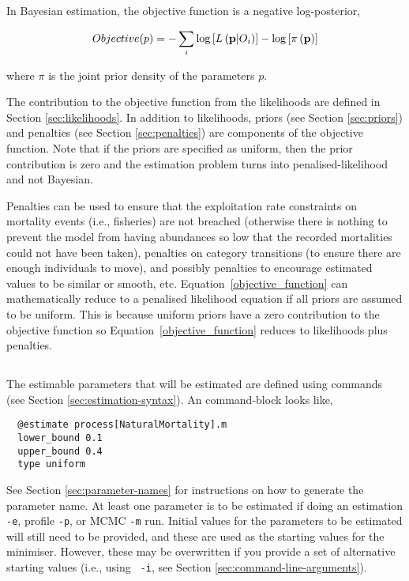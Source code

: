 In Bayesian estimation, the objective function is a negative log-posterior,

\begin{equation}\label{objective_function}
Objective(p)= - \sum\limits_i {\log \left[ {L\left( {{\bf{p}}|O_i } \right)} \right]}  - \log \left[ {\pi \left( {\bf{p}} \right)} \right]
\end{equation}

where $\pi$ is the joint prior density of the parameters $p$.

The contribution to the objective function from the likelihoods are defined in Section \ref{sec:likelihoods}. In addition to likelihoods, priors (see Section \ref{sec:priors}) and penalties (see Section \ref{sec:penalties}) are components of the objective function. Note that if the priors are specified as uniform, then the prior contribution is zero and the estimation problem turns into penalised-likelihood and not Bayesian.

Penalties can be used to ensure that the exploitation rate constraints on mortality events (i.e., fisheries) are not breached (otherwise there is nothing to prevent the model from having abundances so low that the recorded mortalities could not have been taken), penalties on category transitions (to ensure there are enough individuals to move), and possibly penalties to encourage estimated values to be similar or smooth, etc. Equation~\ref{objective_function} can mathematically reduce to a penalised likelihood equation if all priors are assumed to be uniform. This is because uniform priors have a zero contribution to the objective function so Equation~\ref{objective_function} reduces to likelihoods plus penalties.

\subsection{\label{sec:estimate-free-parameters}}
The estimable parameters that will be estimated are defined using  commands (see Section \ref{sec:estimation-syntax}). An  command-block looks like,

{\small{\begin{verbatim}
  @estimate process[NaturalMortality].m
  lower_bound 0.1
  upper_bound 0.4
  type uniform
\end{verbatim}}}

See Section \ref{sec:parameter-names} for instructions on how to generate the parameter name. At least one parameter is to be estimated if doing an estimation \texttt{-e}, profile \texttt{-p}, or MCMC \texttt{-m} run. Initial values for the parameters to be estimated will still need to be provided, and these are used as the starting values for the minimiser. However, these may be overwritten if you provide a set of alternative starting values (i.e., using  \texttt{\cname\ -i}, see Section \ref{sec:command-line-arguments}).

